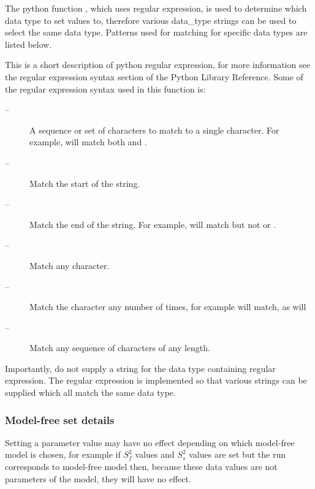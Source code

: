 The python function , which uses regular expression, is used to determine which data type to set values to, therefore various data\_type strings can be used to select the same data type.  Patterns used for matching for specific data types are listed below.


This is a short description of python regular expression, for more information see the regular expression syntax section of the Python Library Reference.  Some of the regular expression syntax used in this function is:


\begin{description}
\item[\quotecmd{[]} --]  A sequence or set of characters to match to a single character.  For example,  will match both  and . 
\item[\quotecmd{\^{}} --]  Match the start of the string. 
\item[\quotecmd{\$} --]  Match the end of the string.  For example,  will match  but not  or . 
\item[ --]  Match any character. 
\item[ --]  Match the character  any number of times, for example  will match, as will  
\item[ --]  Match any sequence of characters of any length. 
\end{description}


Importantly, do not supply a string for the data type containing regular expression.  The regular expression is implemented so that various strings can be supplied which all match the same data type.



\subsubsection{Model-free set details}

Setting a parameter value may have no effect depending on which model-free model is chosen, for example if $S^2_f$ values and $S^2_s$ values are set but the run corresponds to model-free model  then, because these data values are not parameters of the model, they will have no effect.


